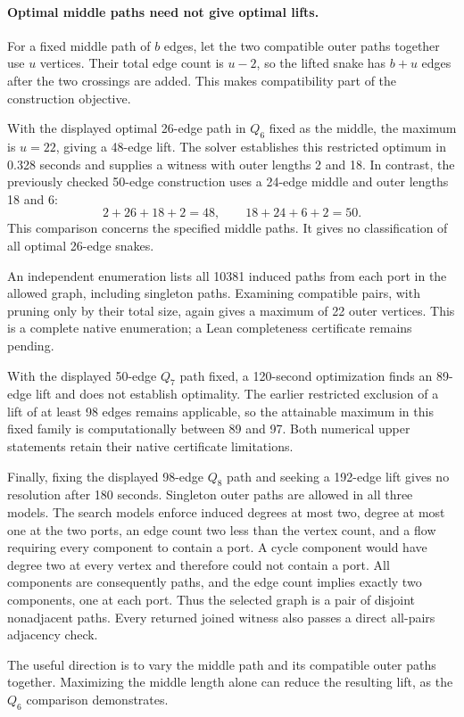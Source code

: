 \documentclass[11pt,a4paper]{article}
\theoremstyle{definition}
\theoremstyle{remark}
\begin{document}
\paragraph{Optimal middle paths need not give optimal lifts.}
For a fixed middle path of $b$ edges, let the two compatible outer
paths together use $u$ vertices. Their total edge count is $u-2$, so
the lifted snake has $b+u$ edges after the two crossings are added.
This makes compatibility part of the construction objective.

With the displayed optimal 26-edge path in $Q_6$ fixed as the middle,
the maximum is $u=22$, giving a 48-edge lift. The solver establishes
this restricted optimum in 0.328 seconds and supplies a witness with
outer lengths 2 and 18. In contrast, the previously checked 50-edge
construction uses a 24-edge middle and outer lengths 18 and 6:
\[
2+26+18+2=48,\qquad 18+24+6+2=50.
\]
This comparison concerns the specified middle paths. It gives no
classification of all optimal 26-edge snakes.

An independent enumeration lists all 10381 induced paths from each port
in the allowed graph, including singleton paths. Examining compatible
pairs, with pruning only by their total size, again gives a maximum
of 22 outer vertices. This is a complete native enumeration; a Lean
completeness certificate remains pending.

With the displayed 50-edge $Q_7$ path fixed, a 120-second optimization
finds an 89-edge lift and does not establish optimality. The earlier
restricted exclusion of a lift of at least 98 edges remains applicable,
so the attainable maximum in this fixed family is computationally
between 89 and 97. Both numerical upper statements retain their native
certificate limitations.

Finally, fixing the displayed 98-edge $Q_8$ path and seeking a
192-edge lift gives no resolution after 180 seconds. Singleton outer
paths are allowed in all three models. The search models enforce
induced degrees at most two, degree at most one at the two ports,
an edge count two less than the vertex count, and a flow requiring
every component to contain a port. A cycle component would have degree
two at every vertex and therefore could not contain a port. All
components are consequently paths, and the edge count implies exactly
two components, one at each port. Thus the selected graph is a pair
of disjoint nonadjacent paths. Every returned
joined witness also passes a direct all-pairs adjacency check.

The useful direction is to vary the middle path and its compatible
outer paths together. Maximizing the middle length alone can reduce
the resulting lift, as the $Q_6$ comparison demonstrates.
\end{document}
